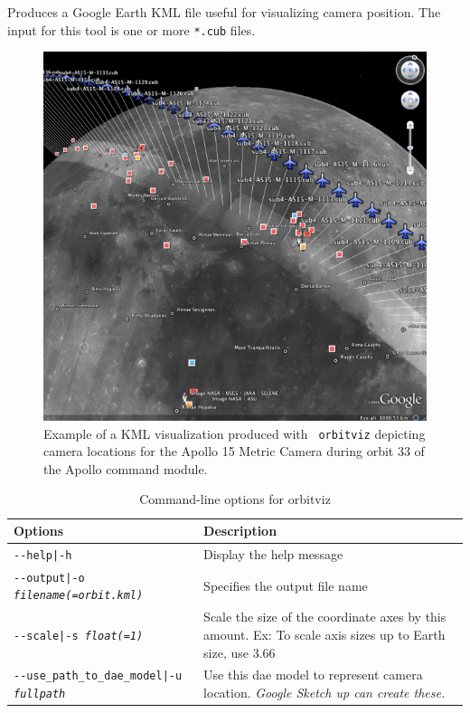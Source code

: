 Produces a Google Earth \ac{KML} file useful for visualizing camera
position. The input for this tool is one or more \texttt{*.cub} files.

\begin{figure}[!b]
  \begin{center}
  \includegraphics[width=6in]{images/orbitviz_ge_result_600px.png}
  \end{center}
  \caption{ Example of a \ac{KML} visualization produced with {\tt
      orbitviz} depicting camera locations for the Apollo 15 Metric
    Camera during orbit 33 of the Apollo command module.}
  \label{fig:orbitviz_example}
\end{figure}

\begin{longtable}{|l|p{10cm}|}
\caption{Command-line options for orbitviz}
\label{tbl:orbitviz}
\endfirsthead
\endhead
\endfoot
\endlastfoot
\hline
Options & Description \\ \hline \hline
\texttt{-\/-help|-h} & Display the help message\\ \hline
\texttt{-\/-output|-o \textit{filename(=orbit.kml)}} & Specifies the output file name \\ \hline
\texttt{-\/-scale|-s \textit{float(=1)}} & Scale the size of the coordinate axes by this amount. Ex: To scale axis sizes up to Earth size, use 3.66 \\ \hline
\texttt{-\/-use\_path\_to\_dae\_model|-u \textit{fullpath}} & Use this dae model to represent camera location. \emph{Google Sketch up can create these.} \\ \hline
\end{longtable}

